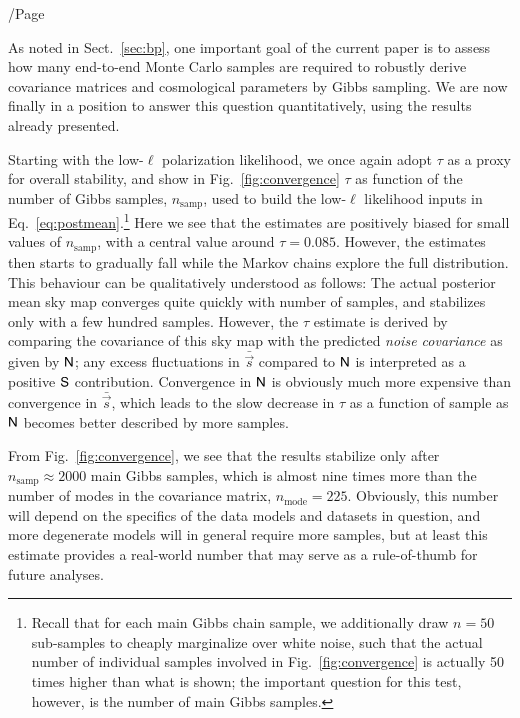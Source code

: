 /Page\documentclass[twocolumn]{aa}
\newcommand{\s}[0]{\vec{s}}
\newcommand{\N}[0]{\tens{N}}
\renewcommand{\S}[0]{\tens{S}}
\begin{document}
As noted in Sect.~\ref{sec:bp}, one important goal of the current
paper is to assess how many end-to-end Monte Carlo samples are
required to robustly derive covariance matrices and cosmological
parameters by Gibbs sampling. We are now finally in a position to
answer this question quantitatively, using the results already
presented.

Starting with the low-$\ell$ polarization likelihood, we once again
adopt $\tau$ as a proxy for overall stability, and show in
Fig.~\ref{fig:convergence} $\tau$ as function of the number of Gibbs
samples, $n_{\mathrm{samp}}$, used to build the low-$\ell$ likelihood
inputs in Eq.~\ref{eq:postmean}.\footnote{Recall that for each main
  Gibbs chain sample, we additionally draw $n=50$ sub-samples to
  cheaply marginalize over white noise, such that the actual number of
  individual samples involved in Fig.~\ref{fig:convergence} is
  actually 50 times higher than what is shown; the important question
  for this test, however, is the number of main Gibbs samples.} Here
we see that the estimates are positively biased for small values of
$n_{\mathrm{samp}}$, with a central value around
$\tau=0.085$. However, the estimates then starts to gradually fall
while the Markov chains explore the full distribution. This behaviour
can be qualitatively understood as follows: The actual posterior mean
sky map converges quite quickly with number of samples, and stabilizes
only with a few hundred samples. However, the $\tau$ estimate is
derived by comparing the covariance of this sky map with the predicted
\emph{noise covariance} as given by $\N$; any excess fluctuations in
$\bar{\s}$ compared to $\N$ is interpreted as a positive $\S$
contribution. Convergence in $\N$ is obviously much more expensive 
than convergence in $\bar{\s}$, which leads to the slow decrease in 
$\tau$ as a function of sample as $\N$ becomes better 
described by more samples.

From Fig.~\ref{fig:convergence}, we see that the results stabilize
only after $n_{\mathrm{samp}}\approx 2000$ main Gibbs samples, which
is almost nine times more than the number of modes in the covariance
matrix, $n_{\mathrm{mode}}=225$. Obviously, this number will depend on
the specifics of the data models and datasets in question, and more
degenerate models will in general require more samples, but at least
this estimate provides a real-world number that may serve as a
rule-of-thumb for future analyses.
\end{document}
